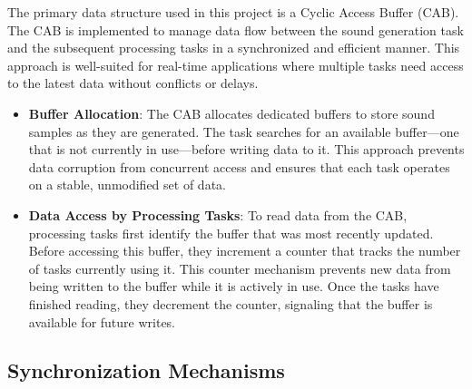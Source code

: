 \documentclass[a4paper,12pt]{article}
\begin{document}
The primary data structure used in this project is a Cyclic Access Buffer (CAB). The CAB is implemented to manage data flow between the sound generation task and the subsequent processing tasks in a synchronized and efficient manner. This approach is well-suited for real-time applications where multiple tasks need access to the latest data without conflicts or delays.
\begin{itemize}
    \item \textbf{Buffer Allocation}: The CAB allocates dedicated buffers to store sound samples as they are generated. The task searches for an available buffer—one that is not currently in use—before writing data to it. This approach prevents data corruption from concurrent access and ensures that each task operates on a stable, unmodified set of data.
    
    \item \textbf{Data Access by Processing Tasks}: To read data from the CAB, processing tasks first identify the buffer that was most recently updated. Before accessing this buffer, they increment a counter that tracks the number of tasks currently using it. This counter mechanism prevents new data from being written to the buffer while it is actively in use. Once the tasks have finished reading, they decrement the counter, signaling that the buffer is available for future writes.
\end{itemize}


\subsection{Synchronization Mechanisms}
\end{document}
